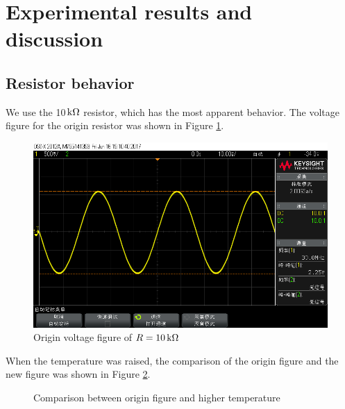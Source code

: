 \documentclass{article}
\newcommand{\unit}[1]{{\rm\,#1}}
\begin{document}
\newpage

\section{Experimental results and discussion}

\subsection{Resistor behavior}

We use the 10$\unit{k\Omega}$ resistor, which has the most apparent behavior. The voltage figure for the origin resistor was shown in Figure \ref{fig-1-1}.

\begin{figure}[htbp]
	\centering
	\includegraphics[width=0.7\linewidth]{imgs/scope_26.png}
	\caption{Origin voltage figure of $R=10\unit{k\Omega}$}
	\label{fig-1-1}
\end{figure}

When the temperature was raised, the comparison of the origin figure and the new figure was shown in Figure \ref{fig-1-2}.

\begin{figure}[htbp]
	\centering
	\caption{Comparison between origin figure and higher temperature}
	\label{fig-1-2}
\end{figure}
\end{document}
